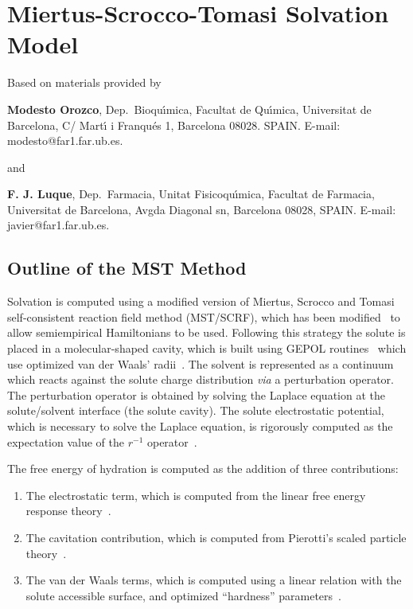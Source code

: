 \section{Miertus-Scrocco-Tomasi Solvation Model}
\label{mst}
\begin{center}Based on materials provided by\end{center}

{\bf Modesto Orozco}, Dep.\ Bioqu\'{\i}mica, Facultat de Qu\'{\i}mica,
Universitat de Barcelona, C/ Mart\'{\i} i Franqu\'{e}s 1, Barcelona 08028. 
SPAIN. E-mail: modesto@far1.far.ub.es.

and

{\bf F. J. Luque}, Dep.\ Farmacia, Unitat Fisicoqu\'{\i}mica, Facultat de
Farmacia,  Universitat de Barcelona, Avgda Diagonal sn,  Barcelona 08028,
SPAIN. E-mail: javier@far1.far.ub.es.

\subsection{Outline of the MST Method}
Solvation is computed using a modified version of Miertus, Scrocco and 
Tomasi~\cite{mst,mt} self-consistent reaction field method (MST/SCRF), which 
has been modified~\cite{lno,glo,nol,lbo,obl} to allow semiempirical
Hamiltonians  to be used. Following this strategy the  solute is placed in a
molecular-shaped cavity, which is built using GEPOL  routines~\cite{pastb}
which use optimized van der Waals' radii~\cite{ojl,blo,rap}.  The solvent is 
represented as a continuum which reacts against the solute charge distribution 
{\em via} a perturbation operator. The perturbation operator is obtained by 
solving the Laplace equation at the solute/solvent interface (the solute
cavity).  The solute electrostatic potential, which is necessary to solve the
Laplace equation, is rigorously computed as the expectation value of the 
$r^{-1}$ operator~\cite{mst,mt,lno,glo,nol,lbo,obl}.

The free energy of hydration is computed as the addition of three
contributions: 

\begin{enumerate}
\item The electrostatic term, which is computed from the linear free energy
response  theory~\cite{mst,mt,lno,glo,nol,lbo,obl}.

\item The cavitation contribution, which is computed from Pierotti's  scaled
particle theory~\cite{ojl,blo}.

\item The van der Waals terms, which is computed using a linear relation with 
the solute accessible surface, and optimized ``hardness''
parameters~\cite{rap}. 
\end{enumerate}

